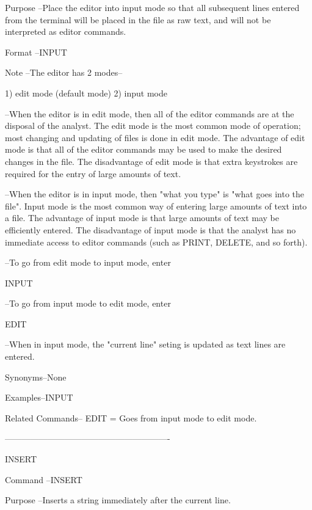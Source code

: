 Purpose --Place the editor into    input mode
          so that all subsequent lines entered
          from the terminal will be placed in the
          file as raw text, and will not be
          interpreted as editor commands.
 
Format  --INPUT
 
Note    --The editor has 2 modes--
 
             1) edit  mode (default mode)
             2) input mode
 
        --When the editor is in    edit mode,
          then all of the editor commands are
          at the disposal of the analyst.
          The     edit mode    is the most common
          mode of operation; most changing and updating
          of files is done in    edit mode.
          The advantage of    edit mode   is that
          all of the editor commands may be used to
          make the desired changes in the file.
          The disadvantage of    edit mode is that
          extra keystrokes are required for the entry
          of large amounts of text.
 
        --When the editor is in    input mode,
          then "what you type" is "what goes into
          the file".  Input mode   is the most
          common way of entering large amounts
          of text into a file.
          The advantage of    input mode   is that
          large amounts of text may be efficiently
          entered.   The disadvantage of    input mode
          is that the analyst has no immediate access
          to editor commands (such as PRINT, DELETE,
          and so forth).
 
        --To go from edit mode to input mode, enter
 
             INPUT
 
        --To go from input mode to edit mode, enter
 
             EDIT
 
        --When in    input mode, the "current line"
          seting is updated as text lines are entered.
 
Synonyms--None
 
Examples--INPUT
 
Related Commands--
          EDIT            = Goes from input mode to edit mode.
 
----------------------------------------------------------
 
INSERT
 
Command --INSERT
 
Purpose --Inserts a string immediately after
          the current line.
 
